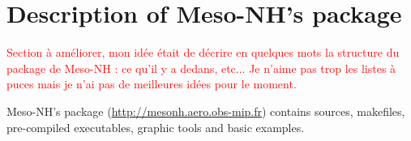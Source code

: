\section{Description of Meso-NH's package}
\label{sec:description_mesonh_package}

\begin{warningblock}
\textcolor{red}{Section à améliorer, mon idée était de décrire en quelques mots la structure du package de Meso-NH : ce qu'il y a dedans, etc... Je n'aime pas trop les listes à puces mais je n'ai pas de meilleures idées pour le moment.}
\end{warningblock}

Meso-NH's package (\href{http://mesonh.aero.obs-mip.fr}{http://mesonh.aero.obs-mip.fr}) contains sources, makefiles, pre-compiled executables, graphic tools and basic examples. \\

